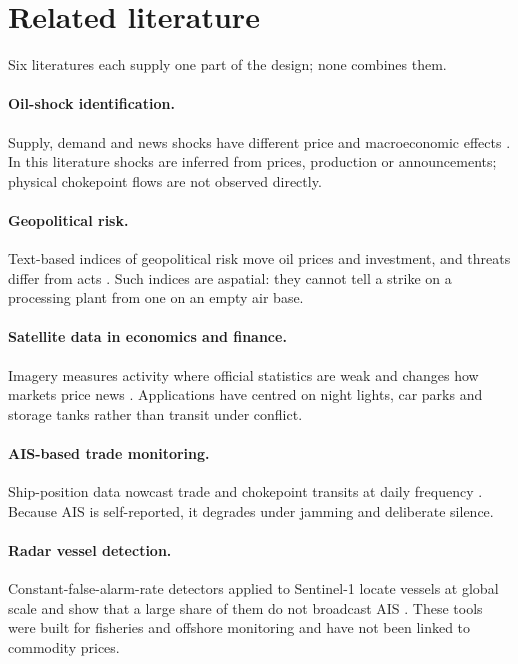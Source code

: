 \documentclass{article}
\begin{document}
\section{Related literature}
\label{sec:lit}

Six literatures each supply one part of the design; none combines them.

\paragraph{Oil-shock identification.} Supply, demand and news shocks have different price and macroeconomic effects \citep{kilian2009,kilianmurphy2014,baumeister2019,kanzig2021}. In this literature shocks are inferred from prices, production or announcements; physical chokepoint flows are not observed directly.

\paragraph{Geopolitical risk.} Text-based indices of geopolitical risk move oil prices and investment, and threats differ from acts \citep{caldara2022}. Such indices are aspatial: they cannot tell a strike on a processing plant from one on an empty air base.

\paragraph{Satellite data in economics and finance.} Imagery measures activity where official statistics are weak and changes how markets price news \citep{henderson2012,donaldson2016,mukherjee2021}. Applications have centred on night lights, car parks and storage tanks rather than transit under conflict.

\paragraph{AIS-based trade monitoring.} Ship-position data nowcast trade and chokepoint transits at daily frequency \citep{cerdeiro2020,arslanalp2021,verschuur2022}. Because AIS is self-reported, it degrades under jamming and deliberate silence.

\paragraph{Radar vessel detection.} Constant-false-alarm-rate detectors applied to Sentinel-1 locate vessels at global scale and show that a large share of them do not broadcast AIS \citep{crisp2004,greidanus2017,paolo2024}. These tools were built for fisheries and offshore monitoring and have not been linked to commodity prices.
\end{document}
